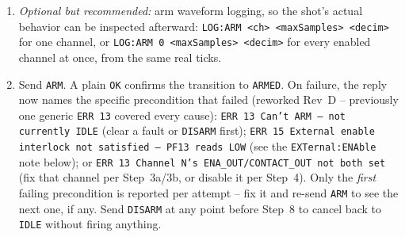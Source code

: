 \documentclass[11pt]{article}
\newcommand{\code}[1]{\texttt{#1}}
\begin{document}
\begin{enumerate}[label=\arabic*.]
    have to match).
  \item \emph{Optional but recommended:} arm waveform logging, so the
    shot's actual behavior can be inspected afterward:
    \code{LOG:ARM <ch> <maxSamples> <decim>} for one channel, or
    \code{LOG:ARM 0 <maxSamples> <decim>} for every enabled channel at
    once, from the same real ticks.
  \item Send \code{ARM}. A plain \code{OK} confirms the transition to
    \code{ARMED}. On failure, the reply now names the specific
    precondition that failed (reworked Rev~D -- previously one generic
    \code{ERR 13} covered every cause): \code{ERR 13 Can't ARM -- not
    currently IDLE} (clear a fault or \code{DISARM} first);
    \code{ERR 15 External enable interlock not satisfied -- PF13 reads
    LOW} (see the \code{EXTernal:ENAble} note below); or
    \code{ERR 13 Channel~N's ENA\_OUT/CONTACT\_OUT not both set} (fix
    that channel per Step~3a/3b, or disable it per Step~4). Only the
    \emph{first} failing precondition is reported per attempt -- fix it
    and re-send \code{ARM} to see the next one, if any. Send
    \code{DISARM} at any point before Step~8 to cancel back to
    \code{IDLE} without firing anything.


\end{enumerate}
\end{document}
